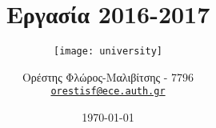 

\subject{Συστήματα Πολυμέσων και Εικονική Πραγματικότητα}
\title{Εργασία 2016-2017}
\subtitle{\centering\texttt{[image: university]}}
\author{
    Ορέστης Φλώρος-Μαλιβίτσης - 7796\\ \texttt{\href{mailto:orestisf@ece.auth.gr}{orestisf@ece.auth.gr}}
}
\date{\today}


\maketitle
{}
\tableofcontents
\listoflistings
\setcounter{page}{1}

\setcounter{section}{-1}





